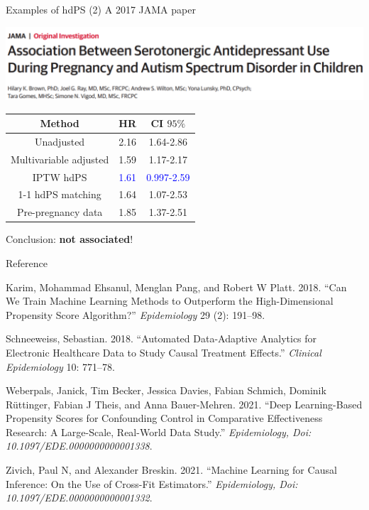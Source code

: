 \documentclass[
  ignorenonframetext,
  aspectratio=169]{beamer}
\newlength{\cslhangindent}
\newlength{\cslentryspacingunit} %
\newenvironment{CSLReferences}[2] %
 {%
  \setlength{\parindent}{0pt}
  \ifodd #1
  \let\oldpar\par
  \def\par{\hangindent=\cslhangindent\oldpar}
  \fi
  \setlength{\parskip}{#2\cslentryspacingunit}
 }%
 {}
\begin{document}
\begin{frame}{Examples of hdPS (2)}
\protect\hypertarget{examples-of-hdps-2}{}
A 2017 JAMA paper

\begin{center}
\includegraphics[width=0.5\linewidth]{jama.png} 
\end{center}

\begin{center}
\begin{tabular}{ c c c }
 \toprule
Method & HR & CI $95\%$ \\ 
 \midrule
Unadjusted & 2.16 & 1.64-2.86\\
Multivariable adjusted & 1.59 & 1.17-2.17\\
IPTW hdPS & \textcolor{blue}{1.61} & \textcolor{blue}{0.997-2.59}\\
1-1 hdPS matching &  1.64 & 1.07-2.53\\
Pre-pregnancy data & 1.85 & 1.37-2.51\\
 \bottomrule
\end{tabular}
\end{center}

Conclusion: \textbf{not associated}!
\end{frame}

\begin{frame}{Reference}
\protect\hypertarget{reference}{}
\hypertarget{refs}{}
\begin{CSLReferences}{1}{0}
\leavevmode{}%
Karim, Mohammad Ehsanul, Menglan Pang, and Robert W Platt. 2018. {``Can
We Train Machine Learning Methods to Outperform the High-Dimensional
Propensity Score Algorithm?''} \emph{Epidemiology} 29 (2): 191--98.

\leavevmode{}%
Schneeweiss, Sebastian. 2018. {``Automated Data-Adaptive Analytics for
Electronic Healthcare Data to Study Causal Treatment Effects.''}
\emph{Clinical Epidemiology} 10: 771--78.

\leavevmode{}%
Weberpals, Janick, Tim Becker, Jessica Davies, Fabian Schmich, Dominik
Rüttinger, Fabian J Theis, and Anna Bauer-Mehren. 2021. {``Deep
Learning-Based Propensity Scores for Confounding Control in Comparative
Effectiveness Research: A Large-Scale, Real-World Data Study.''}
\emph{Epidemiology, Doi: 10.1097/EDE.0000000000001338}.

\leavevmode{}%
Zivich, Paul N, and Alexander Breskin. 2021. {``Machine Learning for
Causal Inference: On the Use of Cross-Fit Estimators.''}
\emph{Epidemiology, Doi: 10.1097/EDE.0000000000001332}.

\end{CSLReferences}
\end{frame}
\end{document}
